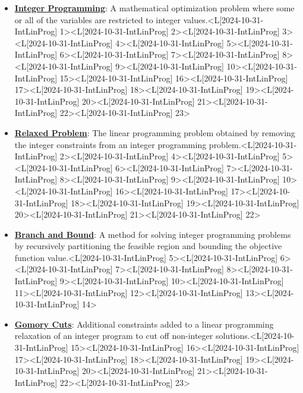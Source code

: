 \documentclass{article}%
\begin{document}
\begin{itemize}[[leftmargin=*]]%
\item \href{https://www.math.purdue.edu/~yipn/421/2024-10-31-IntLinProg.pdf#page=1}{\textbf{Integer Programming}}: A mathematical optimization problem where some or all of the variables are restricted to integer values.<L[2024-10-31-IntLinProg] 1><L[2024-10-31-IntLinProg] 2><L[2024-10-31-IntLinProg] 3><L[2024-10-31-IntLinProg] 4><L[2024-10-31-IntLinProg] 5><L[2024-10-31-IntLinProg] 6><L[2024-10-31-IntLinProg] 7><L[2024-10-31-IntLinProg] 8><L[2024-10-31-IntLinProg] 9><L[2024-10-31-IntLinProg] 10><L[2024-10-31-IntLinProg] 15><L[2024-10-31-IntLinProg] 16><L[2024-10-31-IntLinProg] 17><L[2024-10-31-IntLinProg] 18><L[2024-10-31-IntLinProg] 19><L[2024-10-31-IntLinProg] 20><L[2024-10-31-IntLinProg] 21><L[2024-10-31-IntLinProg] 22><L[2024-10-31-IntLinProg] 23>%
\item \href{https://www.math.purdue.edu/~yipn/421/2024-10-31-IntLinProg.pdf#page=2}{\textbf{Relaxed Problem}}: The linear programming problem obtained by removing the integer constraints from an integer programming problem.<L[2024-10-31-IntLinProg] 2><L[2024-10-31-IntLinProg] 4><L[2024-10-31-IntLinProg] 5><L[2024-10-31-IntLinProg] 6><L[2024-10-31-IntLinProg] 7><L[2024-10-31-IntLinProg] 8><L[2024-10-31-IntLinProg] 9><L[2024-10-31-IntLinProg] 10><L[2024-10-31-IntLinProg] 16><L[2024-10-31-IntLinProg] 17><L[2024-10-31-IntLinProg] 18><L[2024-10-31-IntLinProg] 19><L[2024-10-31-IntLinProg] 20><L[2024-10-31-IntLinProg] 21><L[2024-10-31-IntLinProg] 22>%
\item \href{https://www.math.purdue.edu/~yipn/421/2024-10-31-IntLinProg.pdf#page=5}{\textbf{Branch and Bound}}: A method for solving integer programming problems by recursively partitioning the feasible region and bounding the objective function value.<L[2024-10-31-IntLinProg] 5><L[2024-10-31-IntLinProg] 6><L[2024-10-31-IntLinProg] 7><L[2024-10-31-IntLinProg] 8><L[2024-10-31-IntLinProg] 9><L[2024-10-31-IntLinProg] 10><L[2024-10-31-IntLinProg] 11><L[2024-10-31-IntLinProg] 12><L[2024-10-31-IntLinProg] 13><L[2024-10-31-IntLinProg] 14>%
\item \href{https://www.math.purdue.edu/~yipn/421/2024-10-31-IntLinProg.pdf#page=15}{\textbf{Gomory Cuts}}: Additional constraints added to a linear programming relaxation of an integer program to cut off non-integer solutions.<L[2024-10-31-IntLinProg] 15><L[2024-10-31-IntLinProg] 16><L[2024-10-31-IntLinProg] 17><L[2024-10-31-IntLinProg] 18><L[2024-10-31-IntLinProg] 19><L[2024-10-31-IntLinProg] 20><L[2024-10-31-IntLinProg] 21><L[2024-10-31-IntLinProg] 22><L[2024-10-31-IntLinProg] 23>%
\end{itemize}%
\end{document}
